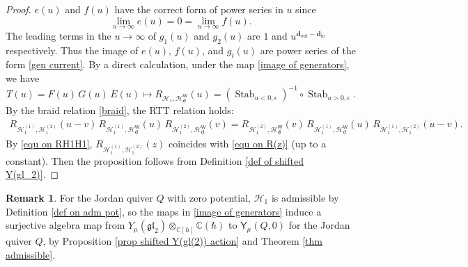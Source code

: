 \documentclass[10pt]{amsart}
\theoremstyle{definition}
\newtheorem{Remark}[Theorem]{Remark}
\numberwithin{equation}{section}
\newcommand{\bC}{\mathbb{C}}
\newcommand{\bd}{\mathbf{d}}
\newcommand{\sW}{\mathsf{W}}
\newcommand{\Stab}{\operatorname{Stab}}
\newcommand{\In}{\operatorname{in}}
\newcommand{\Out}{\operatorname{out}}
\begin{document}
\begin{proof}
$e(u)$ and $f(u)$ have the correct form of power series in $u$ since 
$$\lim_{u\to \infty}e(u)=0=\lim_{u\to \infty}f(u). $$ 
The leading terms in the $u\to \infty$ of $g_1(u)$ and $g_2(u)$ are $1$ and $u^{\bd_{\Out}-\bd_{\In}}$ respectively. Thus the image of $e(u)$, $f(u)$, and $g_i(u)$ are power series of the form \eqref{gen current}. By a direct calculation, under the map \eqref{image of generators}, we have
$$T(u)=F(u)\,G(u)\,E(u)\mapsto R_{\mathcal H_1,\mathcal H^{\sW}_{\underline{\bd}}}(u)=\left(\Stab_{u<0,\epsilon} \right)^{-1} \circ \Stab_{u>0,\epsilon}. $$ 
By the braid relation \eqref{braid}, the RTT relation holds:
\begin{align*}
    R_{\mathcal H^{(1)}_1,\mathcal H^{(2)}_1}(u-v)\,R_{\mathcal H^{(1)}_1,\mathcal H^{\sW}_{\underline{\bd}}}(u)\,R_{\mathcal H^{(2)}_1,\mathcal H^{\sW}_{\underline{\bd}}}(v)=R_{\mathcal H^{(2)}_1,\mathcal H^{\sW}_{\underline{\bd}}}(v)\,R_{\mathcal H^{(1)}_1,\mathcal H^{\sW}_{\underline{\bd}}}(u)\,R_{\mathcal H^{(1)}_1,\mathcal H^{(2)}_1}(u-v).
\end{align*}
By \eqref{equ on RH1H1}, $R_{\mathcal H^{(1)}_1,\mathcal H^{(2)}_1}(z)$ coincides with \eqref{equ on R(z)} (up to a constant). 
Then the proposition follows from Definition \ref{def of shifted Y(gl_2)}.
\end{proof}


\begin{Remark}\label{rmk on Y(gl_2) map}
For the Jordan quiver $Q$ with zero potential, $\mathcal H_1$ is admissible by Definition \ref{def on adm pot}, so the maps in \eqref{image of generators} induce a surjective algebra map from $Y_{\mu}(\mathfrak{gl}_2)\otimes_{\bC[\hbar]}\bC(\hbar)$ to $\mathsf Y_{\mu}(Q,0)$ for the Jordan quiver $Q$, by Proposition \ref{prop shifted Y(gl(2)) action} and Theorem \ref{thm admissible}.
\end{Remark}
\end{document}
